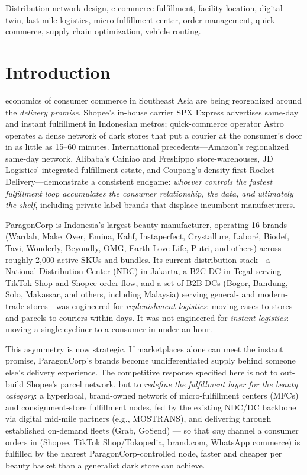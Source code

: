 \documentclass[journal]{IEEEtran}
\begin{document}
\begin{IEEEkeywords}
Distribution network design, e-commerce fulfillment, facility location, digital twin, last-mile logistics, micro-fulfillment center, order management, quick commerce, supply chain optimization, vehicle routing.
\end{IEEEkeywords}

\IEEEpeerreviewmaketitle

\section{Introduction}
 economics of consumer commerce in Southeast Asia are being reorganized around the \emph{delivery promise}. Shopee's in-house carrier SPX Express advertises same-day and instant fulfillment in Indonesian metros; quick-commerce operator Astro operates a dense network of dark stores that put a courier at the consumer's door in as little as 15--60 minutes. International precedents---Amazon's regionalized same-day network, Alibaba's Cainiao and Freshippo store-warehouses, JD Logistics' integrated fulfillment estate, and Coupang's density-first Rocket Delivery---demonstrate a consistent endgame: \emph{whoever controls the fastest fulfillment loop accumulates the consumer relationship, the data, and ultimately the shelf}, including private-label brands that displace incumbent manufacturers.

ParagonCorp is Indonesia's largest beauty manufacturer, operating 16 brands (Wardah, Make~Over, Emina, Kahf, Instaperfect, Crystallure, Labor\'e, Biodef, Tavi, Wonderly, Beyondly, OMG, Earth Love Life, Putri, and others) across roughly 2{,}000 active SKUs and bundles. Its current distribution stack---a National Distribution Center (NDC) in Jakarta, a B2C DC in Tegal serving TikTok Shop and Shopee order flow, and a set of B2B DCs (Bogor, Bandung, Solo, Makassar, and others, including Malaysia) serving general- and modern-trade stores---was engineered for \emph{replenishment logistics}: moving cases to stores and parcels to couriers within days. It was not engineered for \emph{instant logistics}: moving a single eyeliner to a consumer in under an hour.

This asymmetry is now strategic. If marketplaces alone can meet the instant promise, ParagonCorp's brands become undifferentiated supply behind someone else's delivery experience. The competitive response specified here is not to out-build Shopee's parcel network, but to \emph{redefine the fulfillment layer for the beauty category}: a hyperlocal, brand-owned network of micro-fulfillment centers (MFCs) and consignment-store fulfillment nodes, fed by the existing NDC/DC backbone via digital mid-mile partners (e.g., MOSTRANS), and delivering through established on-demand fleets (Grab, GoSend) --- so that \emph{any} channel a consumer orders in (Shopee, TikTok Shop/Tokopedia, brand.com, WhatsApp commerce) is fulfilled by the nearest ParagonCorp-controlled node, faster and cheaper per beauty basket than a generalist dark store can achieve.
\end{document}
